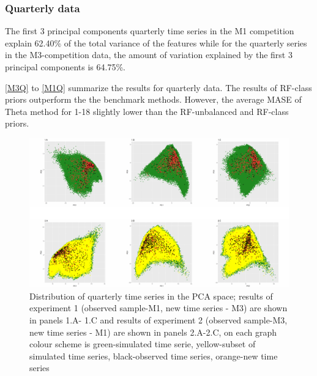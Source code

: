 \documentclass[11pt,a4paper,]{article}
\theoremstyle{definition}
\theoremstyle{definition}
\theoremstyle{definition}
\theoremstyle{remark}
\begin{document}
\subsubsection{Quarterly data}\label{quarterly-data}

The first 3 principal components quarterly time series in the M1
competition explain 62.40\% of the total variance of the features while
for the quarterly series in the M3-competition data, the amount of
variation explained by the first 3 principal components is 64.75\%.

\autoref{M3Q} to \autoref{M1Q} summarize the results for quarterly data.
The results of RF-class priors outperform the the benchmark methods.
However, the average MASE of Theta method for 1-18 slightly lower than
the RF-unbalanced and RF-class priors.

\begin{figure}

{\centering \includegraphics[width=\textwidth]{figure/pca2-1} 

}

\caption{Distribution of quarterly time series in the PCA space; results of experiment 1 (observed sample-M1, new time series - M3) are shown in panels 1.A- 1.C and results of experiment 2 (observed sample-M3, new time series - M1) are shown in panels 2.A-2.C, on each graph colour scheme is green-simulated time serie, yellow-subset of simulated time series, black-observed time series, orange-new time series}\label{fig:pca2}
\end{figure}
\end{document}
